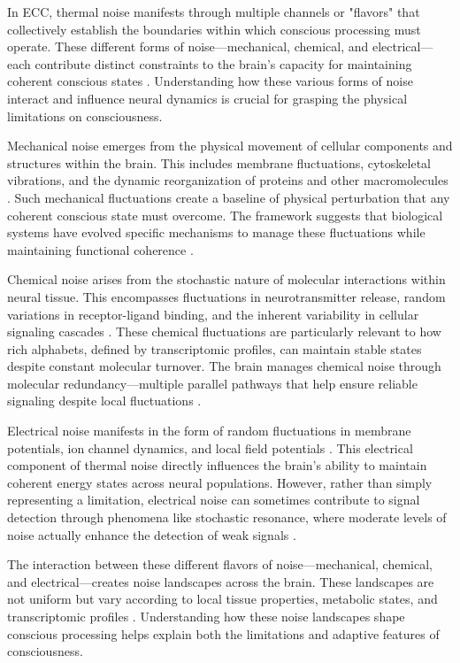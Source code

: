 \begin{refsection}
In ECC, thermal noise manifests through multiple channels or "flavors" that collectively establish the boundaries within which conscious processing must operate. These different forms of noise—mechanical, chemical, and electrical—each contribute distinct constraints to the brain's capacity for maintaining coherent conscious states \cite{faisal2008}. Understanding how these various forms of noise interact and influence neural dynamics is crucial for grasping the physical limitations on consciousness.

Mechanical noise emerges from the physical movement of cellular components and structures within the brain. This includes membrane fluctuations, cytoskeletal vibrations, and the dynamic reorganization of proteins and other macromolecules \cite{bialek2012}. Such mechanical fluctuations create a baseline of physical perturbation that any coherent conscious state must overcome. The framework suggests that biological systems have evolved specific mechanisms to manage these fluctuations while maintaining functional coherence \cite{niven2008}.

Chemical noise arises from the stochastic nature of molecular interactions within neural tissue. This encompasses fluctuations in neurotransmitter release, random variations in receptor-ligand binding, and the inherent variability in cellular signaling cascades \cite{attwell2001}. These chemical fluctuations are particularly relevant to how rich alphabets, defined by transcriptomic profiles, can maintain stable states despite constant molecular turnover. The brain manages chemical noise through molecular redundancy—multiple parallel pathways that help ensure reliable signaling despite local fluctuations \cite{harris2012}.

Electrical noise manifests in the form of random fluctuations in membrane potentials, ion channel dynamics, and local field potentials \cite{vanderziel1988}. This electrical component of thermal noise directly influences the brain's ability to maintain coherent energy states across neural populations. However, rather than simply representing a limitation, electrical noise can sometimes contribute to signal detection through phenomena like stochastic resonance, where moderate levels of noise actually enhance the detection of weak signals \cite{gammaitoni1998}.

The interaction between these different flavors of noise—mechanical, chemical, and electrical—creates noise landscapes across the brain. These landscapes are not uniform but vary according to local tissue properties, metabolic states, and transcriptomic profiles \cite{laughlin2001}. Understanding how these noise landscapes shape conscious processing helps explain both the limitations and adaptive features of consciousness.


\end{refsection}
